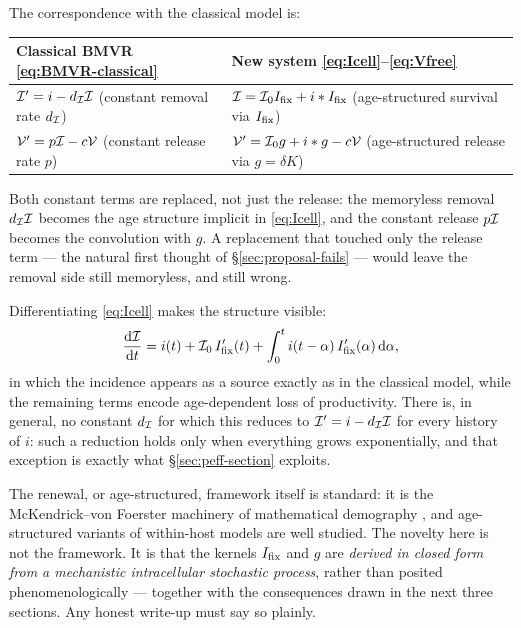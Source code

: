 \noindent
The correspondence with the classical model is:
\begin{center}
\renewcommand{\arraystretch}{1.3}
\begin{tabular}{@{}p{}p{}@{}}
\toprule
Classical BMVR \eqref{eq:BMVR-classical} & New system \eqref{eq:Icell}--\eqref{eq:Vfree} \\
\midrule
$\mathcal{I}'=i-d_{\mathcal{I}}\mathcal{I}$
  (constant removal rate $d_{\mathcal{I}}$)
& $\mathcal{I} = \mathcal{I}_0I_{\mathrm{fix}} + i*I_{\mathrm{fix}}$
  (age-structured survival via $I_{\mathrm{fix}}$) \\[0.6em]
$\mathcal{V}'=p\mathcal{I}-c\mathcal{V}$
  (constant release rate $p$)
& $\mathcal{V}' = \mathcal{I}_0 g + i*g - c\mathcal{V}$
  (age-structured release via $g=\delta K$) \\
\bottomrule
\end{tabular}
\end{center}
Both constant terms are replaced, not just the release: the memoryless
removal $d_{\mathcal{I}}\mathcal{I}$ becomes the age structure implicit in
\eqref{eq:Icell}, and the constant release $p\mathcal{I}$ becomes the
convolution with $g$. A replacement that touched only the release term ---
the natural first thought of \S\ref{sec:proposal-fails} --- would leave the
removal side still memoryless, and still wrong.

Differentiating \eqref{eq:Icell} makes the structure visible:
\begin{equation}
\displaystyle\frac{{\rm d} \mathcal{I}}{{\rm d} t}
= i(t)+\mathcal{I}_0\,I_{\mathrm{fix}}'(t)+\int_0^t i(t-\alpha)\,I_{\mathrm{fix}}'(\alpha)\,{\rm d}\alpha,
\end{equation}
in which the incidence appears as a source exactly as in the classical
model, while the remaining terms encode age-dependent loss of
productivity. There is, in general, no constant $d_{\mathcal{I}}$ for which this
reduces to $\mathcal{I}'=i-d_{\mathcal{I}}\mathcal{I}$ for every history of $i$: such a
reduction holds only when everything grows exponentially, and that exception
is exactly what \S\ref{sec:peff-section} exploits.

\begin{remark}
\label{rem:novelty}
The renewal, or age-structured, framework itself is standard: it is the
McKendrick--von Foerster machinery of mathematical demography
\cite{mckendrick1926applications,vonfoerster1959some}, and age-structured
variants of within-host models are well studied. The novelty here is not
the framework. It is that the kernels $I_{\mathrm{fix}}$ and $g$ are \emph{derived in
closed form from a mechanistic intracellular stochastic process}, rather
than posited phenomenologically --- together with the consequences drawn in
the next three sections. Any honest write-up must say so plainly.
\end{remark}

